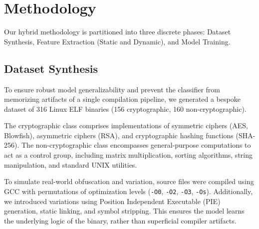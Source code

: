 \documentclass[conference]{IEEEtran}
\begin{document}
\section{Methodology}

Our hybrid methodology is partitioned into three discrete phases: Dataset Synthesis, Feature Extraction (Static and Dynamic), and Model Training.

\subsection{Dataset Synthesis}
To ensure robust model generalizability and prevent the classifier from memorizing artifacts of a single compilation pipeline, we generated a bespoke dataset of 316 Linux ELF binaries (156 cryptographic, 160 non-cryptographic). 

The cryptographic class comprises implementations of symmetric ciphers (AES, Blowfish), asymmetric ciphers (RSA), and cryptographic hashing functions (SHA-256). The non-cryptographic class encompasses general-purpose computations to act as a control group, including matrix multiplication, sorting algorithms, string manipulation, and standard UNIX utilities. 

To simulate real-world obfuscation and variation, source files were compiled using GCC with permutations of optimization levels (\texttt{-O0}, \texttt{-O2}, \texttt{-O3}, \texttt{-Os}). Additionally, we introduced variations using Position Independent Executable (PIE) generation, static linking, and symbol stripping. This ensures the model learns the underlying logic of the binary, rather than superficial compiler artifacts.
\end{document}
